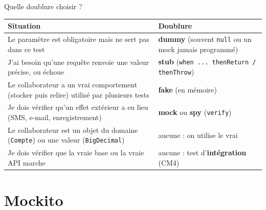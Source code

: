 \documentclass[aspectratio=169,10pt]{beamer}
\begin{document}
\begin{frame}{Quelle doublure choisir ?}
  \small
  \begin{datacard}
    \begin{tabular}{@{}p{6.4cm}p{6.2cm}@{}}
      \toprule
      \textbf{Situation} & \textbf{Doublure} \\
      \midrule
      Le paramètre est obligatoire mais ne sert pas dans ce test & \textbf{dummy} (souvent \texttt{null} ou un mock jamais programmé) \\[0.5mm]
      J'ai besoin qu'une requête renvoie une valeur précise, ou échoue & \textbf{stub} (\texttt{when ... thenReturn / thenThrow}) \\[0.5mm]
      Le collaborateur a un vrai comportement (stocker puis relire) utilisé par plusieurs tests & \textbf{fake} (en mémoire) \\[0.5mm]
      Je dois vérifier qu'un effet extérieur a eu lieu (SMS, e-mail, enregistrement) & \textbf{mock} ou \textbf{spy} (\texttt{verify}) \\[0.5mm]
      Le collaborateur est un objet du domaine (\texttt{Compte}) ou une valeur (\texttt{BigDecimal}) & \alert{aucune} : on utilise le vrai \\[0.5mm]
      Je dois vérifier que la vraie base ou la vraie API marche & \alert{aucune} : test d'\textbf{intégration} (CM4) \\
      \bottomrule
    \end{tabular}
  \end{datacard}
\end{frame}

\section{Mockito}
\end{document}
